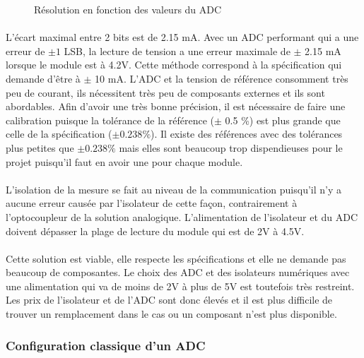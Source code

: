 \begin{figure}[H]
\begin{minipage}{0.45\textwidth}
			\caption{Résolution en fonction des valeurs du ADC}
			\label{fig:res_vref}
		\end{minipage}	
	\end{figure}	
	
	\paragraph*{}
	L'écart maximal entre 2 bits est de 2.15 mA. Avec un ADC performant qui a une erreur de $\pm 1$ LSB, la lecture de tension a une erreur maximale de $\pm $ 2.15 mA lorsque le module est à 4.2V. Cette méthode correspond à la spécification qui demande d'être à $\pm $ 10 mA. L'ADC et la tension de référence consomment très peu de courant, ils nécessitent très peu de composants externes et ils sont abordables. Afin d'avoir une très bonne précision, il est nécessaire de faire une calibration puisque la tolérance de la référence ($\pm$ 0.5 \%) est plus grande que celle de la spécification ($\pm 0.238 \%$). Il existe des références avec des tolérances plus petites que $\pm 0.238 \%$ mais elles sont beaucoup trop dispendieuses pour le projet puisqu'il faut en avoir une pour chaque module.    
	
	\paragraph*{}
	L'isolation de la mesure se fait au niveau de la communication puisqu'il n'y a aucune erreur causée par l'isolateur de cette façon, contrairement à l'optocoupleur de la solution analogique. L'alimentation de l'isolateur et du ADC doivent dépasser la plage de lecture du module qui est de 2V à 4.5V.
	
	\paragraph*{}
	Cette solution est viable, elle respecte les spécifications et elle ne demande pas beaucoup de composantes. Le choix des ADC et des isolateurs numériques avec une alimentation qui va de moins de 2V à plus de 5V est toutefois très restreint. Les prix de l'isolateur et de l'ADC sont donc élevés et il est plus difficile de trouver un remplacement dans le cas ou un composant n'est plus disponible.   
	
	\subsubsection*{Configuration classique d'un ADC}
